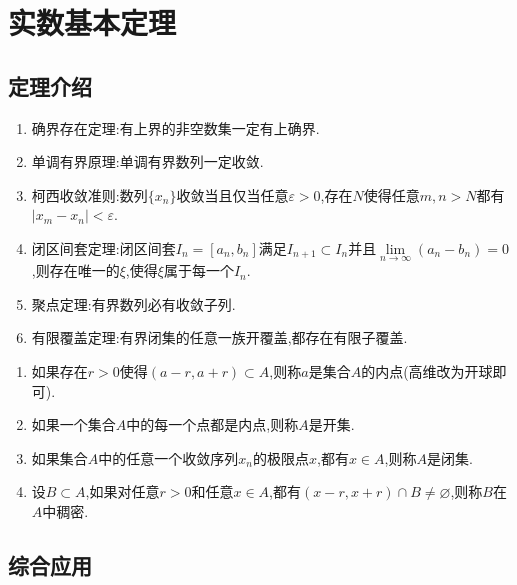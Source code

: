 \documentclass[../../main.tex]{subfiles}%
\begin{document}
\section{实数基本定理}

\subsection{定理介绍}

\begin{theorem}[实数基本定理]\label{theorem:实数基本定理}
\begin{enumerate}
\item 确界存在定理:有上界的非空数集一定有上确界.
\item 单调有界原理:单调有界数列一定收敛.
\item 柯西收敛准则:数列\(\{x_n\}\)收敛当且仅当任意\(\varepsilon > 0\),存在\(N\)使得任意\(m,n > N\)都有\(\vert x_m - x_n\vert < \varepsilon\).
\item 闭区间套定理:闭区间套\(I_n = [a_n,b_n]\)满足\(I_{n + 1} \subset I_n\)并且\(\lim\limits_{n \to \infty} (a_n - b_n) = 0\),则存在唯一的\(\xi\),使得\(\xi\)属于每一个\(I_n\).
\item 聚点定理:有界数列必有收敛子列.
\item 有限覆盖定理:有界闭集的任意一族开覆盖,都存在有限子覆盖.
\end{enumerate}
\end{theorem}

\begin{definition}[点集相关概念]\label{definition:点集相关概念}
\begin{enumerate}
\item 如果存在\(r > 0\)使得\((a - r,a + r) \subset A\),则称\(a\)是集合\(A\)的内点(高维改为开球即可).
\item 如果一个集合\(A\)中的每一个点都是内点,则称\(A\)是开集.
\item 如果集合\(A\)中的任意一个收敛序列\(x_n\)的极限点\(x\),都有\(x\in A\),则称\(A\)是闭集.
\item 设\(B\subset A\),如果对任意\(r > 0\)和任意\(x\in A\),都有\((x - r,x + r)\cap B\neq\varnothing\),则称\(B\)在\(A\)中稠密.
\end{enumerate}
\end{definition}

\subsection{综合应用}
\end{document}
